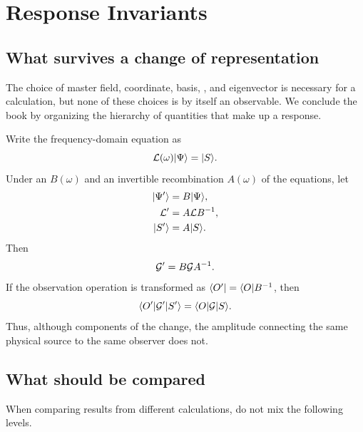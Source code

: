 \chapter{Response Invariants}
\label{chap:response-invariants}

\section{What survives a change of representation}

The choice of master field, coordinate, basis, , and eigenvector  is necessary for a calculation, but none of these choices is by itself an observable. We conclude the book by organizing the hierarchy of quantities that make up a response.

Write the frequency-domain equation as
\begin{equation}
\mathcal{L}(\omega)\lvert \Psi \rangle
=
\lvert S \rangle.
\end{equation}
Under an  $B(\omega)$ and an invertible recombination $A(\omega)$ of the equations, let
\begin{align}
\lvert \Psi' \rangle
&=
B\lvert \Psi \rangle,
\\
\mathcal{L}'
&=
A\mathcal{L} B^{-1},
\\
\lvert S' \rangle
&=
A\lvert S \rangle.
\end{align}
Then
\begin{equation}
\mathcal{G}'
=
B\mathcal{G} A^{-1}.
\label{eq:green-field-redefinition}
\end{equation}
If the observation operation is transformed as $\langle O' \rvert=\langle O \rvert B^{-1}$, then
\begin{equation}
\langle O' \rvert\mathcal{G}'\lvert S' \rangle
=
\langle O \rvert\mathcal{G}\lvert S \rangle.
\label{eq:physical-amplitude-invariant}
\end{equation}
Thus, although components of the  change, the amplitude connecting the same physical source to the same observer does not.

\section{What should be compared}

When comparing results from different calculations, do not mix the following levels.

